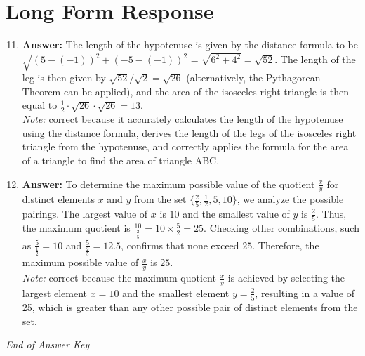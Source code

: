 \documentclass[12pt]{article}
\begin{document}
\section*{Long Form Response}
\begin{enumerate}[label=\arabic*.]
\setcounter{enumi}{10}
\item \textbf{Answer:} The length of the hypotenuse is given by the distance formula to be $\sqrt{(5-(-1))^2 + (-5-(-1))^2} = \sqrt{6^2+4^2} = \sqrt{52}$. The length of the leg is then given by $\sqrt{52}/\sqrt{2} = \sqrt{26}$ (alternatively, the Pythagorean Theorem can be applied), and the area of the isosceles right triangle is then equal to $\frac 12 \cdot \sqrt{26} \cdot \sqrt{26} = \boxed{13}.$
\\ \textit{Note:} correct because it accurately calculates the length of the hypotenuse using the distance formula, derives the length of the legs of the isosceles right triangle from the hypotenuse, and correctly applies the formula for the area of a triangle to find the area of triangle ABC.
\item \textbf{Answer:} To determine the maximum possible value of the quotient \(\frac{x}{y}\) for distinct elements \(x\) and \(y\) from the set \(\{\frac{2}{5}, \frac{1}{2}, 5, 10\}\), we analyze the possible pairings. The largest value of \(x\) is \(10\) and the smallest value of \(y\) is \(\frac{2}{5}\). Thus, the maximum quotient is \(\frac{10}{\frac{2}{5}} = 10 \times \frac{5}{2} = 25\). Checking other combinations, such as \(\frac{5}{\frac{1}{2}} = 10\) and \(\frac{5}{\frac{2}{5}} = 12.5\), confirms that none exceed \(25\). Therefore, the maximum possible value of \(\frac{x}{y}\) is \(25\).
\\ \textit{Note:} correct because the maximum quotient \(\frac{x}{y}\) is achieved by selecting the largest element \(x = 10\) and the smallest element \(y = \frac{2}{5}\), resulting in a value of 25, which is greater than any other possible pair of distinct elements from the set.
\end{enumerate}

\vfill
\noindent\textit{End of Answer Key}
\end{document}
